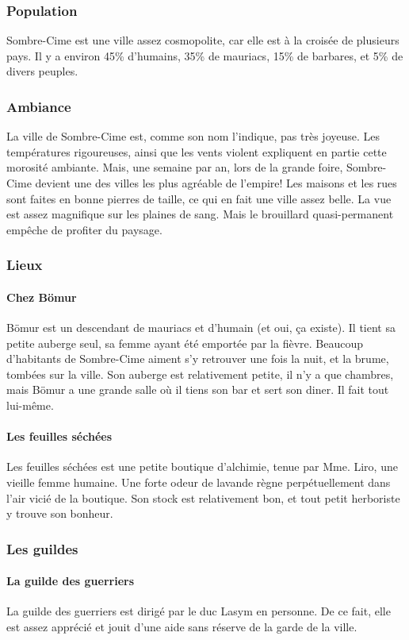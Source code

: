 \subsubsection{Population}
Sombre-Cime est une ville assez cosmopolite, car elle est à la croisée de plusieurs pays.
Il y a environ 45\% d'humains, 35\% de mauriacs, 15\% de barbares, et 5\% de divers peuples.
\subsubsection{Ambiance}
La ville de Sombre-Cime est, comme son nom l'indique, pas très joyeuse. 
Les températures rigoureuses, ainsi que les vents violent expliquent en partie cette morosité ambiante.
Mais, une semaine par an, lors de la grande foire, Sombre-Cime devient une des villes les plus agréable de l'empire!
Les maisons et les rues sont faites en bonne pierres de taille, ce qui en fait une ville assez belle.
La vue est assez magnifique sur les plaines de sang. 
Mais le brouillard quasi-permanent empêche de profiter du paysage.
\subsubsection{Lieux}
\paragraph{Chez Bömur}
Bömur est un descendant de mauriacs et d'humain (et oui, ça existe). 
Il tient sa petite auberge seul, sa femme ayant été emportée par la fièvre.
Beaucoup d'habitants de Sombre-Cime aiment s'y retrouver une fois la nuit, et la brume, tombées sur la ville.
Son auberge est relativement petite, il n'y a que  chambres, mais Bömur a une grande salle où il tiens son bar et sert son diner.
Il fait tout lui-même.
\paragraph{Les feuilles séchées}
Les feuilles séchées est une petite boutique d’alchimie, tenue par Mme. Liro, une vieille femme humaine. Une forte odeur de lavande règne perpétuellement dans l’air vicié de la boutique. Son stock est relativement bon, et tout petit herboriste y trouve son bonheur. 
\subsubsection{Les guildes}
\paragraph{La guilde des guerriers}
La guilde des guerriers est dirigé par le duc Lasym en personne. De ce fait, elle est assez apprécié et jouit d’une aide sans réserve de la garde de la ville.
